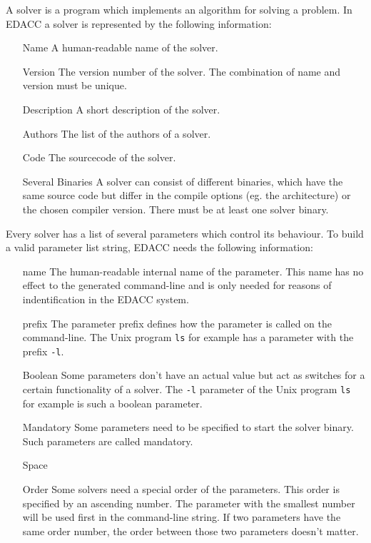  A solver is a program which implements an algorithm for solving a problem. In EDACC a solver is represented by the following information:
\begin{enumerate}
 \item[Name] A human-readable name of the solver.
 \item[Version] The version number of the solver. The combination of name and version must be unique.
 \item[Description] A short description of the solver.
 \item[Authors] The list of the authors of a solver.
 \item[Code] The sourcecode of the solver.
 \item[Several Binaries] A solver can consist of different binaries, which have the same source code but differ in the compile options (eg. the architecture) or the chosen compiler version. There must be at least one solver binary.
\end{enumerate}

 Every solver has a list of several parameters which control its behaviour. To build a valid parameter list string, EDACC needs the following information:
\begin{enumerate}
 \item[name] The human-readable internal name of the parameter. This name has no effect to the generated command-line and is only needed for reasons of indentification in the EDACC system.
 \item[prefix] The parameter prefix defines how the parameter is called on the command-line. The Unix program \verb|ls| for example has a parameter with the prefix \verb|-l|.
 \item[Boolean] Some parameters don't have an actual value but act as switches for a certain functionality of a solver. The \verb|-l| parameter of the Unix program \verb|ls| for example is such a boolean parameter.
 \item[Mandatory] Some parameters need to be specified to start the solver binary. Such parameters are called mandatory.
 \item[Space]
 \item[Order] Some solvers need a special order of the parameters. This order is specified by an ascending number. The parameter with the smallest number will be used first in the command-line string. If two parameters have the same order number, the order between those two parameters doesn't matter.
\end{enumerate}

